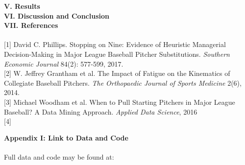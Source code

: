 \documentclass[12 pt]{article}
\begin{document}
\textbf{V. Results} \\

\textbf{VI. Discussion and Conclusion} \\

\pagebreak
\textbf{VII. References} \\
\\
\hypertarget{1}{[1]} David C. Phillips. Stopping on Nine: Evidence of Heuristic 
Managerial Decision-Making in Major League Baseball Pitcher Substitutions.
\emph{Southern Economic Journal} 84(2): 577-599, 2017.
\\
\hypertarget{2}{[2]} W. Jeffrey Grantham et al. The Impact of Fatigue on the Kinematics 
of Collegiate Baseball Pitchers. \emph{The Orthopaedic Journal of Sports Medicine}
2(6), 2014.
\\
\hypertarget{3}{[3]} Michael Woodham et al. When to Pull Starting Pitchers in Major League Baseball? A Data Mining Approach.
\emph{Applied Data Science}, 2016
\\
\hypertarget{4}{[4]} 

\pagebreak
\textbf{Appendix I: Link to Data and Code} \\
\\
Full data and code may be found at: 
\end{document}
